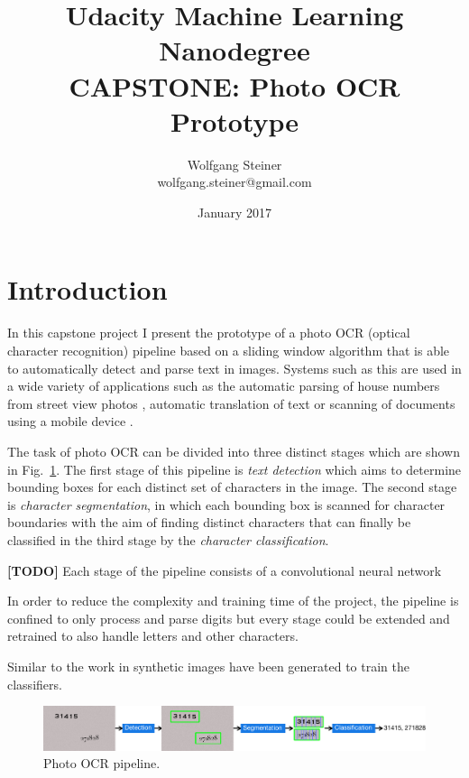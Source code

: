 \documentclass[12pt]{article}
\title{Udacity Machine Learning Nanodegree\\ CAPSTONE: Photo OCR Prototype}
\author{Wolfgang Steiner \\ \small{wolfgang.steiner@gmail.com}}
\date{January 2017}
\newcommand\figref[1]{Fig.~\ref{fig:#1}}
\begin{document}
\maketitle
\section{Introduction}
In this capstone project I present the prototype of a photo OCR (optical character recognition)
pipeline based on a sliding window algorithm that is able to automatically detect and parse
text in images. Systems such as this are used in a wide variety of applications
such as the automatic parsing of house numbers from street view photos \cite{Goodfellow2013},
automatic translation of text \cite{} or scanning of documents using a mobile device \cite{}.

The task of photo OCR can be divided into three distinct stages which are shown in \figref{pipeline}.
The first stage of this pipeline is \emph{text detection} which aims to determine bounding boxes for each
distinct set of characters in the image. The second stage is \emph{character segmentation}, in which
each bounding box is scanned for character boundaries with the aim of finding distinct characters
that can finally be classified in the third stage by the \emph{character classification}.

{\bf[TODO]}
Each stage of the pipeline consists of a convolutional neural network

In order to reduce the complexity and training time of the project, the pipeline is confined to
only process and parse digits but every stage could be extended and retrained to also handle letters
and other characters.

Similar to the work in \cite{Jaderberg2016} synthetic images have been generated to train the classifiers.


\begin{figure}[ht]
    \centering
    \includegraphics[scale=0.8]{fig/Pipeline}
    \caption{Photo OCR pipeline.}
    \label{fig:pipeline}
\end{figure}
\end{document}
